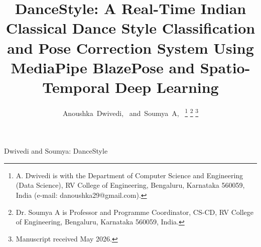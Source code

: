 \documentclass[journal]{IEEEtran}
\begin{document}
\title{DanceStyle: A Real-Time Indian Classical Dance Style Classification
and Pose Correction System Using MediaPipe BlazePose and
Spatio-Temporal Deep Learning}

\author{Anoushka~Dwivedi,~\IEEEmembership{}
        and~Soumya~A,~\IEEEmembership{}%
\thanks{A. Dwivedi is with the Department of Computer Science and
Engineering (Data Science), RV College of Engineering, Bengaluru,
Karnataka 560059, India (e-mail: danoushka29@gmail.com).}%
\thanks{Dr. Soumya A is Professor and Programme Coordinator, CS-CD,
RV College of Engineering, Bengaluru, Karnataka 560059, India.}%
\thanks{Manuscript received May 2026.}}

%
{Dwivedi and Soumya: DanceStyle}

\maketitle
\end{document}
